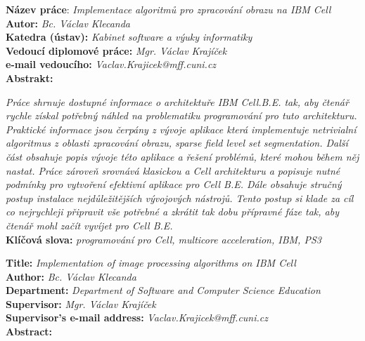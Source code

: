 \raggedbottom


\noindent
\textbf{Název práce}: \textit{Implementace algoritmů pro zpracování obrazu na IBM Cell} \\
\textbf{Autor:} \textit{Bc. Václav Klecanda} \\
\textbf{Katedra (ústav):} \textit{Kabinet software a výuky informatiky} \\
\textbf{Vedoucí diplomové práce:} \textit{Mgr. Václav Krajíček} \\
\textbf{e-mail vedoucího:} \textit{Vaclav.Krajicek@mff.cuni.cz} \\
\textbf{Abstrakt:} \\

\par
\textit{
Práce shrnuje dostupné informace o architektuře IBM Cell.B.E. tak, aby čtenář rychle získal potřebný náhled na problematiku programování pro tuto architekturu.
Praktické informace jsou čerpány z vývoje aplikace která implementuje netrivialní algoritmus z oblasti zpracování obrazu, sparse field level set segmentation.
Další část obsahuje popis vývoje této aplikace a řešení problémů, které mohou během něj nastat.
Práce zároveň srovnává klasickou a Cell architekturu a popisuje nutné podmínky pro vytvoření efektivní aplikace pro Cell B.E.
Dále obsahuje stručný postup instalace nejdůležitějších vývojových nástrojů.
Tento postup si klade za cíl co nejrychleji připravit vše potřebné a zkrátit tak dobu přípravné fáze tak, aby čtenář mohl začít vyvíjet pro Cell B.E.
}\\

\noindent
\textbf{Klíčová slova:} \textit{programování pro Cell, multicore acceleration, IBM, PS3} \\

\pagebreak


\noindent
\textbf{Title:} \textit{Implementation of image processing algorithms on IBM Cell} \\
\textbf{Author:} \textit{Bc. Václav Klecanda} \\
\textbf{Department:} \textit{Department of Software and Computer Science Education} \\
\textbf{Supervisor:} \textit{Mgr. Václav Krajíček} \\
\textbf{Supervisor's e-mail address:} \textit{Vaclav.Krajicek@mff.cuni.cz} \\
\textbf{Abstract:} \\

